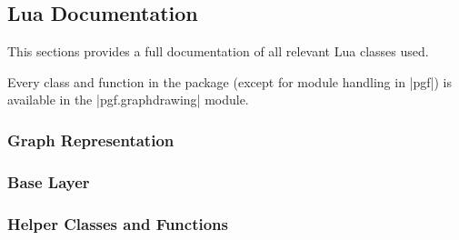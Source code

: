 \subsection{Lua Documentation}
This sections provides a full documentation of all relevant Lua classes
used.

Every class and function in the package (except for module handling in
|pgf|) is available in the |pgf.graphdrawing| module.

\label{section-library-graphdrawing-lua-documentation}
\subsubsection{Graph Representation}
\label{section-library-graphdrawing-lua-documentation-graphrep}






%

\subsubsection{Base Layer}

\label{section-library-graphdrawing-lua-documentation-interface}

\label{section-library-graphdrawing-lua-documentation-sys}


\subsubsection{Helper Classes and Functions}




